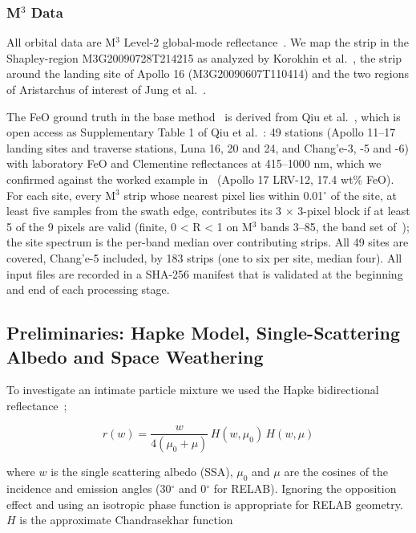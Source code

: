 \documentclass[remotesensing,article,submit,pdftex,moreauthors]{Definitions/mdpi}
\begin{document}
\subsubsection{M$^{3}$ Data}

All orbital data are M$^{3}$ Level-2 global-mode reflectance~\cite{green2011}. We map the strip in the Shapley-region M3G20090728T214215 as analyzed by Korokhin et al.~\cite{korokhin2024}, the strip around the landing site of Apollo 16 (M3G20090607T110414) and the two regions of Aristarchus of interest of Jung et al.~\cite{jung2026}.

The FeO ground truth in the base method~\cite{fernandez2026} is derived from Qiu et al.~\cite{qiu2025jgr}, which is open access as Supplementary Table 1 of Qiu et al.~\cite{qiu2025}: 49 stations (Apollo 11--17 landing sites and traverse stations, Luna 16, 20 and 24, and Chang'e-3, -5 and -6) with laboratory FeO and Clementine reflectances at 415--1000 nm, which we confirmed against the worked example in~\cite{fernandez2026} (Apollo 17 LRV-12, 17.4 wt\% FeO). For each site, every M$^{3}$ strip whose nearest pixel lies within 0.01$^{\circ}$ of the site, at least five samples from the swath edge, contributes its 3 $\times$ 3-pixel block if at least 5 of the 9 pixels are valid (finite, 0 < R < 1 on M$^{3}$ bands 3--85, the band set of~\cite{fernandez2026}); the site spectrum is the per-band median over contributing strips. All 49 sites are covered, Chang'e-5 included, by 183 strips (one to six per site, median four). All input files are recorded in a SHA-256 manifest that is validated at the beginning and end of each processing stage.

\subsection{Preliminaries: Hapke Model, Single-Scattering Albedo and Space Weathering}

To investigate an intimate particle mixture we used the Hapke bidirectional reflectance~\cite{hapke1993};

\begin{equation}
r(w) = \frac{w}{4(\mu_0+\mu)}\,H(w,\mu_0)\,H(w,\mu)
\label{eq1}
\end{equation}

where $w$ is the single scattering albedo (SSA), $\mu_0$ and $\mu$ are the cosines of the incidence and emission angles (30$^{\circ}$ and 0$^{\circ}$ for RELAB). Ignoring the opposition effect and using an isotropic phase function is appropriate for RELAB geometry. $H$ is the approximate Chandrasekhar function
\end{document}
